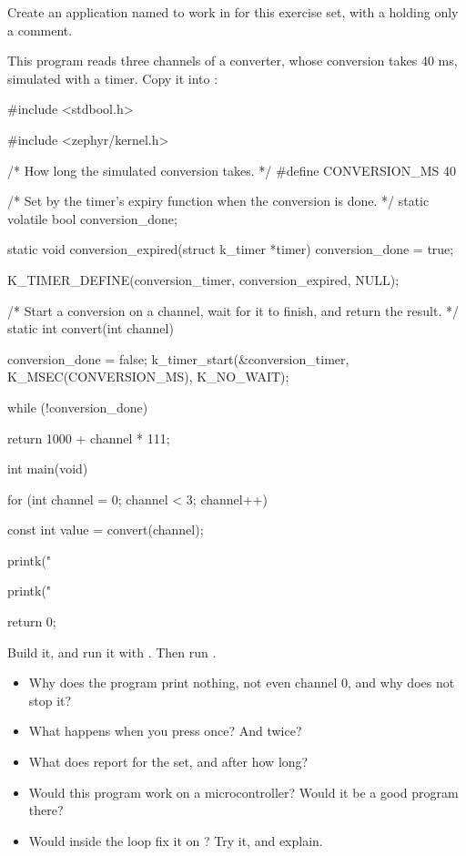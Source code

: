 \label{c3:set:4}
Create an application named  to work in for this exercise set, with a
 holding only a comment.

This program reads three channels of a converter, whose conversion takes 40 ms, simulated with a
timer. Copy it into :

\begin{ccode}
#include <stdbool.h>

#include <zephyr/kernel.h>

/* How long the simulated conversion takes. */
#define CONVERSION_MS 40

/* Set by the timer's expiry function when the conversion is done. */
static volatile bool conversion_done;

static void conversion_expired(struct k_timer *timer)
{
	conversion_done = true;
}

K_TIMER_DEFINE(conversion_timer, conversion_expired, NULL);

/* Start a conversion on a channel, wait for it to finish, and return the result. */
static int convert(int channel)
{
	conversion_done = false;
	k_timer_start(&conversion_timer, K_MSEC(CONVERSION_MS), K_NO_WAIT);

	while (!conversion_done) {
	}

	return 1000 + channel * 111;
}

int main(void)
{
	for (int channel = 0; channel < 3; channel++) {
		const int value = convert(channel);

		printk("%
	}
	printk("%

	return 0;
}
\end{ccode}

\label{c3:ex:4.1}

Build it, and run it with . Then run .

\begin{itemize}
  \item Why does the program print nothing, not even channel 0, and why does  not stop it?
  \item What happens when you press  once? And twice?
  \item What does  report for the set, and after how long?
  \item Would this program work on a microcontroller? Would it be a good program there?
  \item Would  inside the loop fix it on ? Try it, and explain.
\end{itemize}

